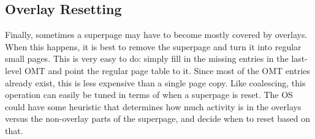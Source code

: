 \subsection{Overlay Resetting}
Finally, sometimes a superpage may have to become mostly covered by overlays. When this happens, it is best to remove the superpage and turn it into regular small pages. This is very easy to do: simply fill in the missing entries in the last-level OMT and point the regular page table to it. Since most of the OMT entries already exist, this is less expensive than a single page copy. Like coalescing, this operation can easily be tuned in terms of when a superpage is reset. The OS could have some heuristic that determines how much activity is in the overlays versus the non-overlay parts of the superpage, and decide when to reset based on that.
